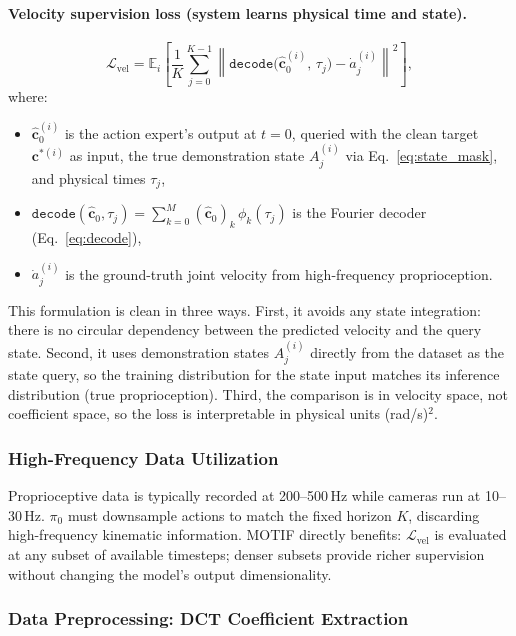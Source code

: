 \documentclass[11pt]{article}
\theoremstyle{plain}
\theoremstyle{definition}
\newcommand{\E}{\mathbb{E}}
\newcommand{\cL}{\mathcal{L}}
\newcommand{\norm}[1]{\left\lVert#1\right\rVert}
\newcommand{\tdiff}{t}
\newcommand{\texec}{\tau}
\newcommand{\ccoeff}{\mathbf{c}}
\begin{document}
\paragraph{Velocity supervision loss (system learns physical time and state).}
\begin{equation}
  \label{eq:vel_loss}
  \cL_{\mathrm{vel}} = \E_{i}\!\left[
    \frac{1}{K}\sum_{j=0}^{K-1}
    \norm{\texttt{decode}\!\bigl(\hat{\ccoeff}_0^{(i)},\,\texec_j\bigr)
      - \dot{a}_j^{(i)}}^2
  \right],
\end{equation}
where:
\begin{itemize}[leftmargin=2em,noitemsep]
  \item $\hat{\ccoeff}_0^{(i)}$ is the action expert's output at $\tdiff=0$,
    queried with the clean target $\ccoeff^{*(i)}$ as input, the true
    demonstration state $A_j^{(i)}$ via Eq.~\eqref{eq:state_mask},
    and physical times $\texec_j$,
  \item $\texttt{decode}(\hat{\ccoeff}_0, \texec_j) = \sum_{k=0}^{M} (\hat{\ccoeff}_0)_k\,\phi_k(\texec_j)$
    is the Fourier decoder (Eq.~\ref{eq:decode}),
  \item $\dot{a}_j^{(i)}$ is the ground-truth joint velocity from
    high-frequency proprioception.
\end{itemize}

This formulation is clean in three ways.
First, it avoids any state integration: there is no circular dependency
between the predicted velocity and the query state.
Second, it uses demonstration states $A_j^{(i)}$ directly from the
dataset as the state query, so the training distribution for the state
input matches its inference distribution (true proprioception).
Third, the comparison is in velocity space, not coefficient space,
so the loss is interpretable in physical units (rad/s)$^2$.

\subsubsection{High-Frequency Data Utilization}

Proprioceptive data is typically recorded at 200--500\,Hz while cameras
run at 10--30\,Hz.
$\pi_0$ must downsample actions to match the fixed horizon $K$,
discarding high-frequency kinematic information.
MOTIF directly benefits: $\cL_{\mathrm{vel}}$ is evaluated at any subset
of available timesteps; denser subsets provide richer supervision without
changing the model's output dimensionality.

\subsubsection{Data Preprocessing: DCT Coefficient Extraction}
\end{document}
